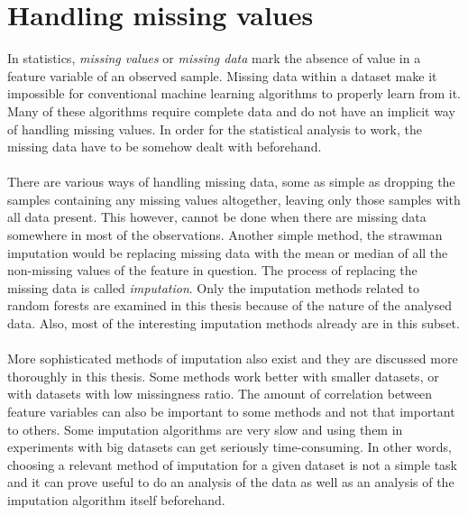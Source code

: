 \documentclass[11pt]{article}
\begin{document}
  \section{Handling missing values}
    In statistics, {\it missing values} or {\it missing data} mark the absence of value in a feature variable of an observed sample. Missing data within a dataset make it impossible for conventional machine learning algorithms to properly learn from it. Many of these algorithms require complete data and do not have an implicit way of handling missing values. In order for the statistical analysis to work, the missing data have to be somehow dealt with beforehand.\cite{otfi}
    \\~\\
    There are various ways of handling missing data, some as simple as dropping the samples containing any missing values altogether, leaving only those samples with all data present.\cite{lwd} This however, cannot be done when there are missing data somewhere in most of the observations. Another simple method, the strawman imputation\cite{otfi} would be replacing missing data with the mean or median of all the non-missing values of the feature in question. The process of replacing the missing data is called {\it imputation}. Only the imputation methods related to random forests are examined in this thesis because of the nature of the analysed data. Also, most of the interesting imputation methods already are in this subset.
    \\~\\
    More sophisticated methods of imputation also exist and they are discussed more thoroughly in this thesis. Some methods work better with smaller datasets, or with datasets with low missingness ratio. The amount of correlation between feature variables can also be important to some methods and not that important to others.\cite{otfi} Some imputation algorithms are very slow and using them in experiments with big datasets can get seriously time-consuming. In other words, choosing a relevant method of imputation for a given dataset is not a simple task and it can prove useful to do an analysis of the data as well as an analysis of the imputation algorithm itself beforehand.
\end{document}
